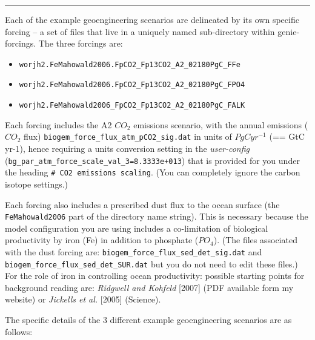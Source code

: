 \documentclass[11pt,fleqn]{book} %
\begin{document}
\vspace{1mm}
\noindent\rule{4cm}{0.1mm}
\vspace{2mm}

\noindent Each of the example geoengineering scenarios are delineated by its own specific forcing – a set of files that live in a uniquely named sub-directory within genie-forcings. The three forcings are:

\vspace{2mm}
\begin{itemize}[noitemsep]
\item
\begin{verbatim}worjh2.FeMahowald2006.FpCO2_Fp13CO2_A2_02180PgC_FFe\end{verbatim}
\item
\begin{verbatim}worjh2.FeMahowald2006.FpCO2_Fp13CO2_A2_02180PgC_FPO4\end{verbatim}
\item
\begin{verbatim}worjh2.FeMahowald2006_FpCO2_Fp13CO2_A2_02180PgC_FALK\end{verbatim}
\end{itemize}
\vspace{2mm}

Each forcing includes the A2 \(CO_{2}\) emissions scenario, with the annual emissions (\(CO_{2}\) flux) \texttt{biogem\_force\_flux\_atm\_pCO2\_sig.dat} in units of \(PgCyr^{-1}\) (== GtC yr-1), hence requiring a units conversion setting in the \textit{user-config} (\texttt{bg\_par\_atm\_force\_scale\_val\_3=8.3333e+013}) that is provided for you under the heading \texttt{\# CO2 emissions scaling}. (You can completely ignore the carbon isotope settings.)

Each forcing also includes a prescribed dust flux to the ocean surface (the \texttt{FeMahowald2006} part of the directory name string). This is necessary because the model configuration you are using includes a co-limitation of biological productivity by iron (Fe) in addition to phosphate (\(PO_{4}\)). (The files associated with the dust forcing are: \texttt{biogem\_force\_flux\_sed\_det\_sig.dat} and \texttt{biogem\_force\_flux\_sed\_det\_SUR.dat} but you do not need to edit these files.) For the role of iron in controlling ocean productivity: possible starting points for background reading are: \textit{Ridgwell and Kohfeld} [2007] (PDF available form my website) or \textit{Jickells et al.} [2005] (Science).

\vspace{1mm}
The specific details of the 3 different example geoengineering scenarios are as follows:
\end{document}
